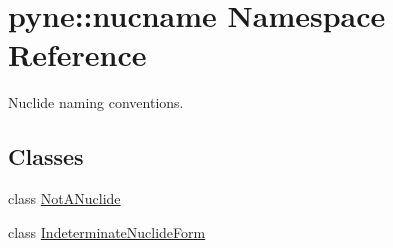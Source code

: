 \hypertarget{namespacepyne_1_1nucname}{\section{pyne\-:\-:nucname Namespace Reference}
\label{namespacepyne_1_1nucname}
}


Nuclide naming conventions.  


\subsection*{Classes}
\begin{DoxyCompactItemize}
\item 
class \hyperlink{classpyne_1_1nucname_1_1_not_a_nuclide}{Not\-A\-Nuclide}
\item 
class \hyperlink{classpyne_1_1nucname_1_1_indeterminate_nuclide_form}{Indeterminate\-Nuclide\-Form}
\end{DoxyCompactItemize}
